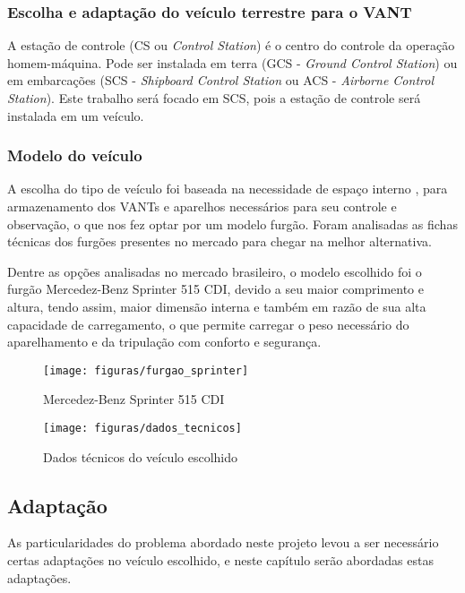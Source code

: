 \subsubsection{Escolha e adaptação do veículo terrestre para o VANT}

A estação de controle (CS ou \textit{Control Station}) é o centro do controle da operação homem-máquina. Pode ser instalada em terra (GCS - \textit{Ground Control Station}) ou em embarcações (SCS - \textit{Shipboard Control Station} ou ACS - \textit{Airborne Control Station}). Este trabalho será focado em SCS, pois a estação de controle será instalada em um veículo.

\subsubsection{Modelo do veículo}

A escolha do tipo de veículo foi baseada na necessidade de espaço interno , para armazenamento dos VANTs e aparelhos necessários para seu controle e observação, o que nos fez optar por um modelo furgão. Foram analisadas as fichas técnicas dos furgões presentes no mercado para chegar na melhor alternativa.

Dentre as opções analisadas no mercado brasileiro, o modelo escolhido foi o furgão Mercedez-Benz Sprinter 515 CDI, devido a seu maior comprimento e altura, tendo assim, maior dimensão interna e também em razão de sua alta capacidade de carregamento, o que permite carregar o peso necessário do aparelhamento e da tripulação com conforto e segurança.

\begin{figure}[H]
\centering\texttt{[image: figuras/furgao\_sprinter]}
\caption{Mercedez-Benz Sprinter 515 CDI}
\end{figure}

\begin{figure}[H]
\centering\texttt{[image: figuras/dados\_tecnicos]}
\caption{Dados técnicos do veículo escolhido}
\end{figure}

\subsection{Adaptação}

As particularidades do problema abordado neste projeto levou a ser necessário certas adaptações no veículo escolhido, e neste capítulo serão abordadas estas adaptações.
